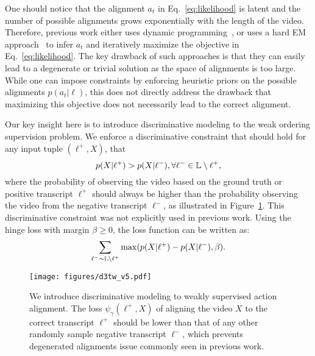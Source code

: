 \documentclass[10pt,twocolumn,letterpaper]{article}
\newcommand{\eqnref}[1]{{Eq.\ \eqref{eq:#1}}}
\begin{document}
One should notice that the alignment $a_t$ in  \eqnref{likelihood} is latent and the number of possible alignments grows exponentially with the length of the video. Therefore, previous work either uses dynamic programming~\cite{huang2016connectionist}, or uses a hard EM approach~\cite{richard2017weakly,richard2018neuralnetwork} to infer $a_t$ and iteratively maximize the objective in \eqnref{likelihood}. The key drawback of such approaches is that they can easily lead to a degenerate or trivial solution as the space of alignments is too large. While one can impose constraints by enforcing heuristic priors on the possible alignments $p(a_t|\ell)$, this does not directly address the drawback that maximizing this objective does not necessarily lead to the correct alignment.


Our key insight here is to introduce discriminative modeling to the weak ordering supervision problem. We enforce a discriminative constraint that should hold for any input tuple $(\ell^+, X)$, that 
\begin{equation}
\vspace{-1mm}
\small
    \label{eq:discriminant}
    p(X|\ell^+) > p(X|\ell^-), \forall \ell^- \in \mathbb{L} \setminus \ell^+,
\end{equation}
where the probability of observing the video based on the ground truth or positive transcript $\ell^+$  should always be higher than the probability observing the video from the negative transcript $\ell^-$, as illustrated in Figure~\ref{fig:d3tw}. This discriminative constraint was not explicitly used in previous work. Using the hinge loss with margin $\beta \ge 0$, the loss function can be written as:
\begin{equation}
\vspace{-1mm}
\small
    \label{eq:hinge_prob}
    \sum_{\ell^- \sim \mathbb{L} \setminus \ell^+} \max (p(X|\ell^+) - p(X| \ell^-), \beta).
\end{equation}



\begin{figure}[tb]
\centering
   \texttt{[image: figures/d3tw\_v5.pdf]}
\caption{
    We introduce discriminative modeling to weakly supervised action alignment. The loss $\psi_\gamma(\ell^+, X)$ of aligning the video $X$ to the correct transcript $\ell^+$ should be lower than that of any other randomly sample negative transcript $\ell^-$, which prevents degenerated alignments issue commonly seen in previous work.
   }
   \vspace{-1mm}
\label{fig:d3tw}
\end{figure}
\end{document}
